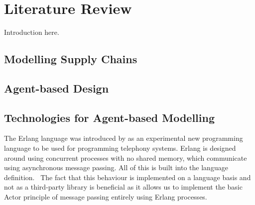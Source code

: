 \section{Literature Review}

Introduction here.

\subsection{Modelling Supply Chains}

\subsection{Agent-based Design}

\subsection{Technologies for Agent-based Modelling}

The Erlang language was introduced by  as an experimental new programming language to be used for programming telephony systems.
Erlang is designed around using concurrent processes with no shared memory, which communicate using asynchronous message passing.
All of this is built into the language definition.~\cite{armstrong2007history}
The fact that this behaviour is implemented on a language basis and not as a third-party library is beneficial as it allows us to implement the basic Actor principle of message passing entirely using Erlang processes.
